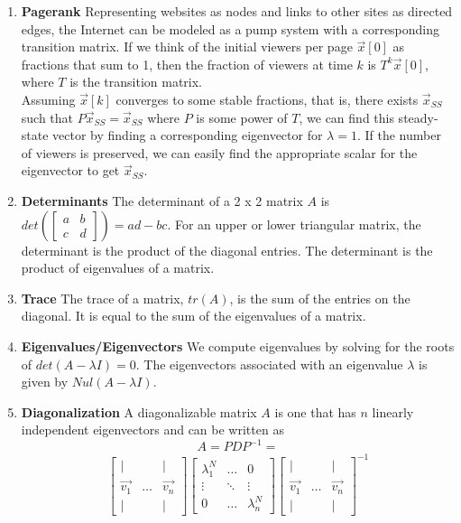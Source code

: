 \documentclass[10pt]{article}
\begin{document}
\begin{multicols}{2}
\begin{enumerate}
    \item \textbf{Pagerank} Representing websites as nodes and links to other sites as directed edges, the Internet can be modeled as a pump system with a corresponding transition matrix. If we think of the initial viewers per page $\vec{x}[0]$ as fractions that sum to 1, then the fraction of viewers at time $k$ is $T^k\vec{x}[0]$, where $T$ is the transition matrix. \\
    Assuming $\vec{x}[k]$ converges to some stable fractions, that is, there exists $\vec{x}_{SS}$ such that $P\vec{x}_{SS}=\vec{x}_{SS}$ where $P$ is some power of $T$, we can find this steady-state vector by finding a corresponding eigenvector for $\lambda = 1$. If the number of viewers is preserved, we can easily find the appropriate scalar for the eigenvector to get $\vec{x}_{SS}$.
    
    \item \textbf{Determinants} The determinant of a 2 x 2 matrix $A$ is $det \left( \begin{bmatrix} a & b \\ c & d \end{bmatrix} \right)=ad-bc$. For an upper or lower triangular matrix, the determinant is the product of the diagonal entries. The determinant is the product of eigenvalues of a matrix.
    
    \item \textbf{Trace} The trace of a matrix, $tr(A)$, is  the sum of the entries on the diagonal. It is equal to the sum of the eigenvalues of a matrix.
    
    \item \textbf{Eigenvalues/Eigenvectors} We compute eigenvalues by solving for the roots of $det( A-\lambda I)=0$. The eigenvectors associated with an eigenvalue $\lambda$ is given by $Nul(A - \lambda I)$.
    
    \item \textbf{Diagonalization} A diagonalizable matrix $A$ is one that has $n$ linearly independent eigenvectors and can be written as 
    $$A=PDP^{-1}= $$
    \begin{align*}
        \begin{bmatrix} 
        | & & | \\
        \vec{v_1} & \hdots & \vec{v_n} \\
        | & & |
        \end{bmatrix}
        \begin{bmatrix}
        \lambda_1^N & \hdots & 0 \\
        \vdots & \ddots & \vdots \\
        0 & \hdots & \lambda_n^N
        \end{bmatrix}
        \begin{bmatrix} 
        | & & | \\
        \vec{v_1} & \hdots & \vec{v_n} \\
        | & & |
        \end{bmatrix}^{-1}
    \end{align*}
    

\end{enumerate}
\end{multicols}
\end{document}
